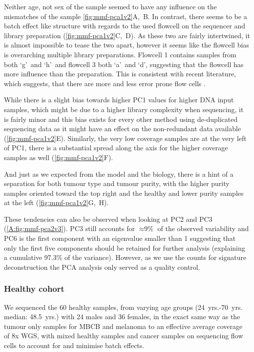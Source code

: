 Neither age, not sex of the sample seemed to have any influence on the mismatches of the sample \autoref{fig:mmf-pca1v2}A,~B. In contrast, there seems to be a batch effect like structure with regards to the used flowcell on the sequencer and library preparation (\autoref{fig:mmf-pca1v2}C,~D). As these two are fairly intertwined, it is almost impossible to tease the two apart, however it seems like the flowcell bias is overarching multiple library preparations. Flowcell 1 contains samples from both \lq g\rq\ and \lq h\rq\ and  flowcell 3 both \lq a\rq\ and \lq d\rq, suggesting that the flowcell has more influence than the preparation. This is consistent with recent literature, which suggests, that there are more and less error prone flow cells \cite{Stoler2021}.

While there is a slight bias towards higher PC1 values for higher DNA input samples, which might be due to a higher library complexity when sequencing, it is fairly minor and this bias exists for every other method using de-duplicated sequencing data as it might have an effect on the non-redundant data available (\autoref{fig:mmf-pca1v2}E). Similarly, the very low coverage samples are at the very left of PC1, there is a substantial spread along the axis for the higher coverage samples as well (\autoref{fig:mmf-pca1v2}F). 

And just as we expected from the model and the biology, there is a hint of a separation for both tumour type and tumour purity, with the higher purity samples oriented toward the top right and the healthy and lower purity samples at the left (\autoref{fig:mmf-pca1v2}G,~H).

These tendencies can also be observed when looking at PC2 and PC3 (\autoref{A:fig:mmf-pca2v3}). PC3 still accounts for $\approx \text{9\%}$ of the observed variability and PC6 is the first component with an eigenvalue smaller than 1 suggesting that only the first five components should be retained for further analysis (explaining a cumulative 97.3\% of the variance). However, as we use the counts for signature deconstruction the PCA analysis only served as a quality control.


\subsubsection{Healthy cohort}
\label{mmf-sec:healthy}

We sequenced the 60 healthy samples, from varying age groups (\num{24}~yrs.-\num{70}~yrs. median: \num{48.5}~yrs.) with 24 males and 36 females, in the exact same way as the tumour only samples for MBCB and melanoma to an effective average coverage of 8x WGS, with mixed healthy samples and cancer samples on sequencing flow cells to account for and minimise batch effects.


